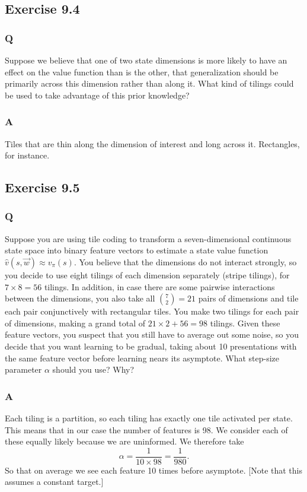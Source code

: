 \subsection{Exercise 9.4}
\subsubsection{Q}
Suppose we believe that one of two state dimensions is more likely to have an effect on the value function than is the other, that generalization should be primarily across this dimension rather than along it. What kind of tilings could be used to take advantage of this prior knowledge?
\subsubsection{A}
Tiles that are thin along the dimension of interest and long across it. Rectangles, for instance.

\subsection{Exercise 9.5}
\subsubsection{Q}
Suppose you are using tile coding to transform a seven-dimensional continuous state space into binary feature vectors to estimate a state value function $\hat{v}(s, \vec{w}) \approx v_\pi(s)$. You believe that the dimensions do not interact strongly, so you decide to use eight tilings of each dimension separately (stripe tilings), for $7 \times 8 = 56$ tilings. In addition, in case there are some pairwise interactions between the dimensions, you also take all $\binom{7}{2} = 21$ pairs of dimensions and tile each pair conjunctively with rectangular tiles. You make two tilings for each pair of dimensions, making a grand total of $21 \times 2 + 56 = 98$ tilings. Given these feature vectors, you suspect that you still have to average out some noise, so you decide that you want learning to be gradual, taking about 10 presentations with the same feature vector before learning nears its asymptote. What step-size parameter $\alpha$ should you use? Why?

\subsubsection{A}
Each tiling is a partition, so each tiling has exactly one tile activated per state. This means that in our case the number of features is 98. We consider each of these equally likely because we are uninformed. We therefore take
\[
\alpha = \frac{1}{10 \times 98} = \frac{1}{980}.
\]
So that on average we see each feature 10 times before asymptote. [Note that this assumes a constant target.]
